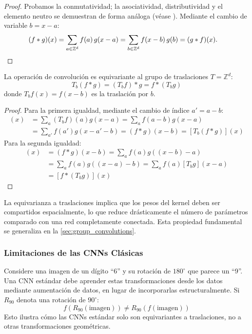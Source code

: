 \begin{proof}
Probamos la conmutatividad; la asociatividad, distributividad y el elemento neutro se demuestran de forma análoga (véase \citep[Cap.~1]{Folland1999}). Mediante el cambio de variable \(b = x - a\):
\begin{align}
(f * g)(x) &= \sum_{a \in \mathbb{Z}^d} f(a)\,g(x - a) = \sum_{b \in \mathbb{Z}^d} f(x - b)\,g(b) = (g * f)(x). \qedhere
\end{align}
\end{proof}

\begin{theorem}\label{theorem:convolution_translation_equivariance}
La operación de convolución es equivariante al grupo de traslaciones \(T = \mathbb{Z}^d\):
\[
T_b(f * g) = (T_b f) * g = f * (T_b g)
\]
donde \(T_b f(x) = f(x - b)\) es la traslación por \(b\).
\end{theorem}

\begin{proof}
Para la primera igualdad, mediante el cambio de índice $a' = a - b$:
\begin{align}
[(T_b f) * g](x) &= \sum_a (T_b f)(a) g(x - a) = \sum_a f(a - b) g(x - a) \\
                  &= \sum_{a'} f(a') g(x - a' - b) = (f * g)(x - b) = [T_b(f * g)](x)
\end{align}
Para la segunda igualdad:
\begin{align}
[T_b(f * g)](x) &= (f * g)(x - b) = \sum_a f(a)g((x-b) - a) \\
                 &= \sum_a f(a)g((x - a) - b) = \sum_a f(a)[T_b g](x - a) \\
                 &= [f * (T_b g)](x)
\end{align}
\end{proof}

La equivarianza a traslaciones implica que los pesos del kernel deben ser compartidos espacialmente, lo que reduce drásticamente el número de parámetros comparado con una red completamente conectada. Esta propiedad fundamental se generaliza en la \autoref{sec:group_convolutions}.

\subsubsection{Limitaciones de las CNNs Clásicas}

\begin{example}
Considere una imagen de un dígito ``6'' y su rotación de $180^{\circ}$ que parece un ``9''. Una \gls{CNN} estándar debe aprender estas transformaciones desde los datos mediante aumentación de datos, en lugar de incorporarlas estructuralmente. Si $R_{90}$ denota una rotación de $90^{\circ}$:
\[
f(R_{90}(\text{imagen})) \neq R_{90}(f(\text{imagen}))
\]
Esto ilustra cómo las \glspl{CNN} estándar solo son equivariantes a traslaciones, no a otras transformaciones geométricas.
\end{example}


